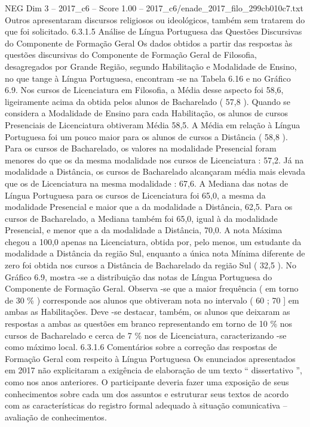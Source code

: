 \begin{textsample}{NEG Dim 3 – 2017\_c6 – Score 1.00 – 2017\_c6/enade\_2017\_filo\_299cb010c7.txt}
Outros apresentaram discursos religiosos ou ideológicos, também sem tratarem do que foi solicitado. 6.3.1.5 Análise de Língua Portuguesa das Questões Discursivas do Componente de Formação Geral Os dados obtidos a partir das respostas às questões discursivas do Componente de Formação Geral de Filosofia, desagregados por Grande Região, segundo Habilitação e Modalidade de Ensino, no que tange à Língua Portuguesa, encontram -se na Tabela 6.16 e no Gráfico 6.9.
Nos cursos de Licenciatura em Filosofia, a Média desse aspecto foi 58,6, ligeiramente acima da obtida pelos alunos de Bacharelado ( 57,8 ).
Quando se considera a Modalidade de Ensino para cada Habilitação, os alunos de cursos Presenciais de Licenciatura obtiveram Média 58,5.
A Média em relação à Língua Portuguesa foi um pouco maior para os alunos de cursos a Distância ( 58,8 ).
Para os cursos de Bacharelado, os valores na modalidade Presencial foram menores do que os da mesma modalidade nos cursos de Licenciatura : 57,2.
Já na modalidade a Distância, os cursos de Bacharelado alcançaram média mais elevada que os de Licenciatura na mesma modalidade : 67,6.
A Mediana das notas de Língua Portuguesa para os cursos de Licenciatura foi 65,0, a mesma da modalidade Presencial e maior que a da modalidade a Distância, 62,5.
Para os cursos de Bacharelado, a Mediana também foi 65,0, igual à da modalidade Presencial, e menor que a da modalidade a Distância, 70,0.
A nota Máxima chegou a 100,0 apenas na Licenciatura, obtida por, pelo menos, um estudante da modalidade a Distância da região Sul, enquanto a única nota Mínima diferente de zero foi obtida nos cursos a Distância de Bacharelado da região Sul ( 32,5 ).
No Gráfico 6.9, mostra -se a distribuição das notas de Língua Portuguesa do Componente de Formação Geral.
Observa -se que a maior frequência ( em torno de 30 \% ) corresponde aos alunos que obtiveram nota no intervalo ( 60 ; 70 ] em ambas as Habilitações.
Deve -se destacar, também, os alunos que deixaram as respostas a ambas as questões em branco representando em torno de 10 \% nos cursos de Bacharelado e cerca de 7 \% nos de Licenciatura, caracterizando -se como máximo local. 6.3.1.6 Comentários sobre a correção das respostas de Formação Geral com respeito à Língua Portuguesa Os enunciados apresentados em 2017 não explicitaram a exigência de elaboração de um texto “ dissertativo ”, como nos anos anteriores.
O participante deveria fazer uma exposição de seus conhecimentos sobre cada um dos assuntos e estruturar seus textos de acordo com as características do registro formal adequado à situação comunicativa – avaliação de conhecimentos.

\end{textsample}
